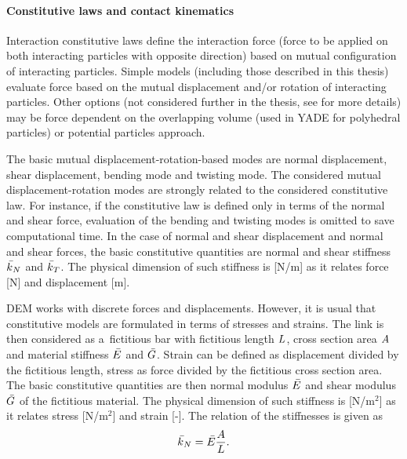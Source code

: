 \paragraph{Constitutive laws and contact kinematics}
Interaction constitutive laws define the interaction force (force to be applied on both interacting particles with opposite direction) based on mutual configuration of interacting particles.
Simple models (including those described in this thesis) evaluate force based on the mutual displacement and/or rotation of interacting particles.
Other options (not considered further in the thesis, see \cite{yade2015} for more details) may be force dependent on the overlapping volume (used in YADE for polyhedral particles) or potential particles approach.

The basic mutual displacement-rotation-based modes are normal displacement, shear displacement, bending mode and twisting mode.
The considered mutual displacement-rotation modes are strongly related to the considered constitutive law.
For instance, if the constitutive law is defined only in terms of the normal and shear force, evaluation of the bending and twisting modes is omitted to save computational time.
In the case of normal and shear displacement and normal and shear forces, the basic constitutive quantities are normal and shear stiffness $\linkStiffnessNormal$ and $\linkStiffnessShear$.
The physical dimension of such stiffness is [N/m] as it relates force [N] and displacement [m].

DEM works with discrete forces and displacements.
However, it is usual that constitutive models are formulated in terms of stresses and strains.
The link is then considered as a~fictitious bar with fictitious length $L$, cross section area $A$ and material stiffness $\linkMaterialStiffnessNormal$ and $\linkMaterialStiffnessShear$.
Strain can be defined as displacement divided by the fictitious length,
stress as force divided by the fictitious cross section area.
The basic constitutive quantities are then normal modulus $\linkMaterialStiffnessNormal$ and shear modulus $\linkMaterialStiffnessShear$ of the fictitious material.
The physical dimension of such stiffness is [N/m$^2$] as it relates stress [N/m$^2$] and strain [-].
The relation of the stiffnesses is given as
\begin{equation}
	\linkStiffnessNormal = \linkMaterialStiffnessNormal\frac{\linkCrossSectionArea}{\linkLength}
	.
\end{equation}

